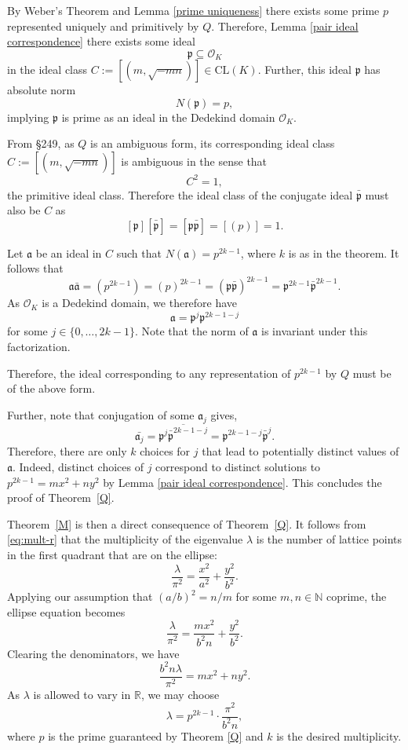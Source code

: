 \documentclass[11pt]{amsart}
\theoremstyle{definition}
\begin{document}
By Weber's Theorem and Lemma \ref{prime uniqueness} there exists some prime $p$ represented uniquely and primitively by $Q$. Therefore, Lemma \ref{pair ideal correspondence} there exists some ideal
\[
\mathfrak{p}\subseteq\mathcal{O}_K
\]
in the ideal class $C:=[(m,\sqrt{-mn})]\in\text{CL}(K)$. Further, this ideal $\mathfrak{p}$ has absolute norm
\[
N(\mathfrak{p})=p,
\]
implying $\mathfrak{p}$ is prime as an ideal in the Dedekind domain $\mathcal{O}_K$.

From \cite{Gauss} \S 249, as $Q$ is an ambiguous form, its corresponding ideal class $C:=[(m,\sqrt{-mn})]$ is ambiguous in the sense that 
\[
C^2=1,
\]
the primitive ideal class. Therefore the ideal class of the conjugate ideal $\bar{\mathfrak{p}}$ must also be $C$ as 
\[
[\mathfrak{p}][\bar{\mathfrak{p}}]=[\mathfrak{p}\bar{\mathfrak{p}}]=[(p)]=1.
\]

Let $\mathfrak{a}$ be an ideal in $C$ such that $N(\mathfrak{a})=p^{2k-1}$, where $k$ is as in the theorem. It follows that 
\[
\mathfrak{a}\bar{\mathfrak{a}}=(p^{2k-1})=(p)^{2k-1}=(\mathfrak{p}\bar{\mathfrak{p}})^{2k-1}=\mathfrak{p}^{2k-1}\bar{\mathfrak{p}}^{2k-1}.
\]
As $\mathcal{O}_K$ is a Dedekind domain, we therefore have 
\[
\mathfrak{a}=\mathfrak{p}^j\mathfrak{p}^{2k-1-j}
\]
for some $j\in\{0,\dots,2k-1\}$. Note that the norm of $\mathfrak{a}$ is invariant under this factorization.

Therefore, the ideal corresponding to any representation of $p^{2k-1}$ by $Q$ must be of the above form.

Further, note that conjugation of some $\mathfrak{a}_j$ gives, 
\[
\bar{\mathfrak{a}_j}=\overline{\mathfrak{p}^j\bar{\mathfrak{p}}^{2k-1-j}}=\mathfrak{p}^{2k-1-j}\bar{\mathfrak{p}}^{j}.
\]
Therefore, there are only $k$ choices for $j$ that lead to potentially distinct values of $\mathfrak{a}$. Indeed, distinct choices of $j$ correspond to distinct solutions to $p^{2k-1}=mx^2+ny^2$ by Lemma \ref{pair ideal correspondence}.  This concludes the proof of
Theorem~\ref{Q}.

Theorem~\ref{M} is then a direct consequence of Theorem~\ref{Q}. It follows from \eqref{eq:mult-r} that the multiplicity of the eigenvalue $\lambda$ is the number of lattice points in the first quadrant that are on the ellipse:
$$
\frac{\lambda}{\pi^2}=\frac{x^2}{a^2}+\frac{y^2}{b^2}.
$$
Applying our assumption that $(a/b)^2=n/m$ for some $m,n\in\mathbb{N}$ coprime, the ellipse equation becomes
\[\dfrac{\lambda}{\pi^2}=\dfrac{mx^2}{b^2n}+\dfrac{y^2}{b^2}.
\] 
Clearing the denominators, we have 
\[
\dfrac{b^2n\lambda}{\pi^2}=mx^2+ny^2.
\] 
As $\lambda$ is allowed to vary in $\mathbb{R}$, we may choose 
\[
\lambda=p^{2k-1}\cdot\dfrac{\pi^2}{b^2n},
\]
where $p$ is the prime guaranteed by Theorem \ref{Q} and $k$ is the desired multiplicity.
\end{document}
